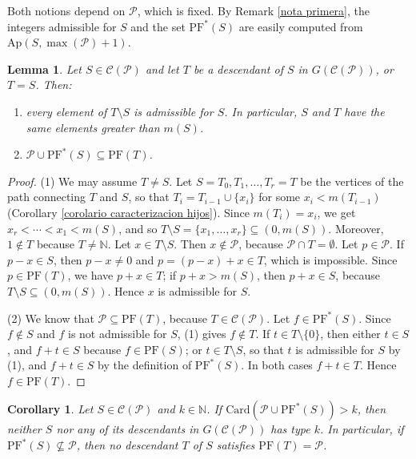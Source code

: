 \documentclass[11pt]{article}
\def\N{\mathbb{N}}
\newtheorem{corollary}[theorem]{Corollary}
\newtheorem{lemma}[theorem]{Lemma}
\numberwithin{equation}{section}
\newcommand{\CP}{\mathcal C(\mathcal P)}
\newcommand{\Ap}{\mathrm{Ap}}
\newcommand{\PF}{\mathrm{PF}}
\newcommand{\PFs}{\mathrm{PF}^{*}}
\begin{document}
Both notions depend on $\mathcal P$, which is fixed. By Remark \ref{nota primera}, the integers admissible for $S$ and the set $\PFs(S)$ are easily computed from $\Ap(S,\max(\mathcal P)+1)$.

\begin{lemma}\label{lema congelados}
Let $S\in\CP$ and let $T$ be a descendant of $S$ in $G(\CP)$, or $T=S$. Then:
\begin{enumerate}
\item every element of $T\setminus S$ is admissible for $S$. In particular, $S$ and $T$ have the same elements greater than $m(S)$.
\item $\mathcal P\cup\PFs(S)\subseteq\PF(T)$.
\end{enumerate}
\end{lemma}

\begin{proof}
(1) We may assume $T\neq S$. Let $S=T_0, T_1,\ldots,T_r=T$ be the vertices of the path connecting $T$ and $S$, so that $T_i=T_{i-1}\cup\{x_i\}$ for some $x_i<m(T_{i-1})$ (Corollary \ref{corolario caracterizacion hijos}). Since $m(T_i)=x_i$, we get $x_r<\cdots<x_1<m(S)$, and so $T\setminus S=\{x_1,\ldots,x_r\}\subseteq(0,m(S))$. Moreover, $1\notin T$ because $T\neq\N$. Let $x\in T\setminus S$. Then $x\notin\mathcal P$, because $\mathcal P\cap T=\emptyset$. Let $p\in\mathcal P$. If $p-x\in S$, then $p-x\neq0$ and $p=(p-x)+x\in T$, which is impossible. Since $p\in\PF(T)$, we have $p+x\in T$; if $p+x>m(S)$, then $p+x\in S$, because $T\setminus S\subseteq(0,m(S))$. Hence $x$ is admissible for $S$.

(2) We know that $\mathcal P\subseteq\PF(T)$, because $T\in\CP$. Let $f\in\PFs(S)$. Since $f\notin S$ and $f$ is not admissible for $S$, (1) gives $f\notin T$. If $t\in T\setminus\{0\}$, then either $t\in S$, and $f+t\in S$ because $f\in\PF(S)$; or $t\in T\setminus S$, so that $t$ is admissible for $S$ by (1), and $f+t\in S$ by the definition of $\PFs(S)$. In both cases $f+t\in T$. Hence $f\in\PF(T)$.
\end{proof}

\begin{corollary}\label{corolario poda}
Let $S\in\CP$ and $k\in\N$. If $\mathrm{Card}(\mathcal P\cup\PFs(S))>k$, then neither $S$ nor any of its descendants in $G(\CP)$ has type $k$. In particular, if $\PFs(S)\not\subseteq\mathcal P$, then no descendant $T$ of $S$ satisfies $\PF(T)=\mathcal P$.
\end{corollary}
\end{document}
